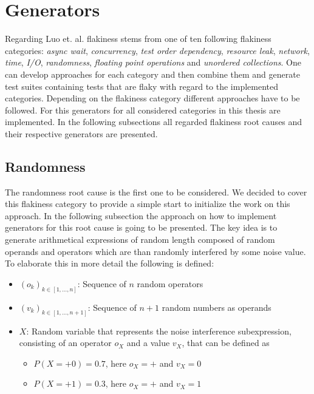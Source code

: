 \documentclass[
fancyheadings, %
%
%
]{stsreprt}
\begin{document}
\section{Generators}
Regarding Luo et. al. \cite{luo:2014} flakiness stems from one of ten following flakiness categories: \textit{async wait}, \textit{concurrency}, \textit{test order dependency}, \textit{resource leak}, \textit{network}, \textit{time}, \textit{I/O}, \textit{randomness}, \textit{floating point operations} and \textit{unordered collections}.
One can develop approaches for each category and then combine them and generate test suites containing tests that are flaky with regard to the implemented categories. 
Depending on the flakiness category different approaches have to be followed. 
For this generators for all considered categories in this thesis are implemented. 
In the following subsections all regarded flakiness root causes and their respective generators are presented. 

\subsection{Randomness}\label{sec:rand}
The randomness root cause is the first one to be considered.
We decided to cover this flakiness category to provide a simple start to initialize the work on this approach. 
In the following subsection the approach on how to implement generators for this root cause is going to be presented. 
The key idea is to generate arithmetical expressions of random length composed of random operands and operators which are than randomly interfered by some noise value. 
To elaborate this in more detail the following is defined: 
\begin{itemize}
    \item $(o_k)_{k \in [1, ..., n]}$: Sequence of $n$ random operators
    \item $(v_{k})_{k \in [1, ..., n+1]}$: Sequence of $n+1$ random numbers as operands 
    \item $X$: Random variable that represents the noise interference subexpression, consisting of an operator $o_X$ and a value $v_X$, that can be defined as
    \begin{itemize}
        \item $P(X=+0)=0.7$, here $o_X = +$ and $v_X = 0$
        \item $P(X=+1)=0.3$, here $o_X = +$ and $v_X = 1$
    \end{itemize}
\end{itemize} 
\end{document}
